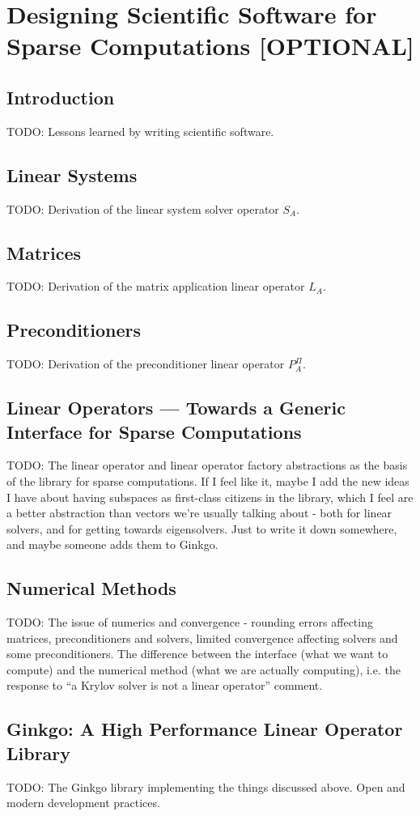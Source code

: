 \section{Designing Scientific Software for Sparse Computations [OPTIONAL]}
\subsection{Introduction}
TODO: Lessons learned by writing scientific software.
\subsection{Linear Systems}
TODO: Derivation of the linear system solver operator $S_A$.
\subsection{Matrices}
TODO: Derivation of the matrix application linear operator $L_A$.
\subsection{Preconditioners}
TODO: Derivation of the preconditioner linear operator $P^\Pi_A$.
\subsection{Linear Operators --- Towards a Generic Interface for Sparse
            Computations}
TODO: The linear operator and linear operator factory abstractions as the basis
      of the library for sparse computations.
      If I feel like it, maybe I add the new ideas I have about having subspaces
      as first-class citizens in the library, which I feel are a better
      abstraction than vectors we're usually talking about - both for linear
      solvers, and for getting towards eigensolvers. Just to write it down
      somewhere, and maybe someone adds them to Ginkgo.
\subsection{Numerical Methods}
TODO: The issue of numerics and convergence - rounding errors affecting
matrices, preconditioners and solvers, limited convergence affecting solvers and
some preconditioners. The difference between the interface (what we want to
compute) and the numerical method (what we are actually computing), i.e. the
response to ``a Krylov solver is not a linear operator'' comment.

\subsection{Ginkgo: A High Performance Linear Operator Library}
TODO: The Ginkgo library implementing the things discussed above. Open and
modern development practices.

